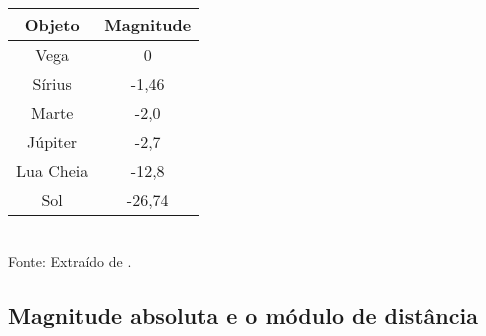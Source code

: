 \begin{table}[h!]
\begin{center}
\begin{tabular}{c|c} 
\hline 
Objeto & Magnitude \\ 
\hline 
Vega & 0 \\ 
Sírius & -1,46 \\
Marte & -2,0 \\
Júpiter & -2,7 \\ 
Lua Cheia & -12,8 \\
Sol & -26,74 \\
\hline 
\end{tabular} \\
\small
\vspace{2mm}Fonte: Extraído de \cite{keplerLivro2013}.
\label{tab:magnitudes}
\end{center}
\end{table}

\subsection{Magnitude absoluta e o módulo de distância}

